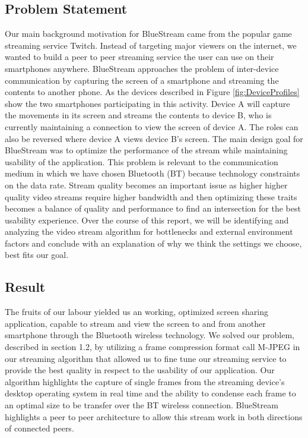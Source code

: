 \documentclass[a4paper,12pt]{article}
\begin{document}
\subsection{Problem Statement}
Our main background motivation for BlueStream came from the popular game streaming service Twitch. Instead of targeting major viewers on the internet, we wanted to build a peer to peer streaming service the user can use on their smartphones anywhere. BlueStream approaches the problem of inter-device communication by capturing the screen of a smartphone and streaming the contents to another phone. As the devices described in Figure \ref{fig:DeviceProfiles} show the two smartphones participating in this activity. Device A will capture the movements in its screen and streams the contents to device B, who is currently maintaining a connection to view the screen of device A. The roles can also be reversed where device A views device B’s screen. The main design goal for BlueStream was to optimize the performance of the stream while maintaining usability of the application. This problem is relevant to the communication medium in which we have chosen Bluetooth (BT) because technology constraints on the data rate. Stream quality becomes an important issue as higher higher quality video streams require higher bandwidth and then optimizing these traits becomes a balance of quality and performance to find an intersection for the best usability experience. Over the course of this report, we will be identifying and analyzing the video stream algorithm for bottlenecks and external environment factors and conclude with an explanation of why we think the settings we choose, best fits our goal. 

\subsection{Result}
The fruits of our labour yielded us an working, optimized screen sharing application, capable to stream and view the screen to and from another smartphone through the Bluetooth wireless technology. We solved our problem, described in section 1.2, by utilizing a frame compression format call M-JPEG in our streaming algorithm that allowed us to fine tune our streaming service to provide the best quality in respect to the usability of our application. Our algorithm highlights the capture of single frames from the streaming device’s desktop operating system in real time and the ability to condense each frame to an optimal size to be transfer over the BT wireless connection. BlueStream highlights a peer to peer architecture to allow this stream work in both directions of connected peers. 
\end{document}
